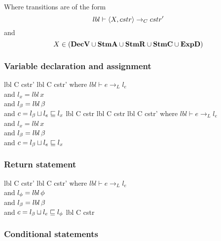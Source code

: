 \noindent Where transitions are of the form
  \[ lbl \vdash \langle X, cstr \rangle \rightarrow_{C} cstr' \]
  and
  \[ X \in (\mathbf{DecV} \cup \mathbf{StmA} \cup \mathbf{StmR} \cup \mathbf{StmC} \cup \mathbf{ExpD}) \]

\subsubsection{Variable declaration and assignment}

\begin{trules}
        {lbl \vdash {} {C} {cstr'} }
        {lbl \vdash {} {C} {cstr'} }
        {where $lbl \vdash e \rightarrow_L l_e$\\
          and $l_x = lbl \, x$\\
          and $l_\beta = lbl \, \beta$\\
          and $c = l_\beta \sqcup l_e \sqsubseteq l_x$}
        {lbl \vdash {} {C} {cstr}}
        {}
        {}
        {lbl \vdash {} {C} {cstr}}
        {lbl \vdash {} {C} {cstr'}}
        {where $lbl \vdash e \rightarrow_L l_e$\\
          and $l_x = lbl \, x$\\
          and $l_\beta = lbl \, \beta$\\
          and $c = l_\beta \sqcup l_e \sqsubseteq l_x$}
\end{trules}

\subsubsection{Return statement}

\begin{trules}
        {lbl \vdash {} {C} {cstr'} }
        {lbl \vdash {} {C} {cstr'} }
        {where $lbl \vdash e \rightarrow_L l_e$\\
          and $l_\phi = lbl \, \phi$\\
          and $l_\beta = lbl \, \beta$\\
          and $c = l_\beta \sqcup l_e \sqsubseteq l_\phi$}
        {lbl \vdash {} {C} {cstr} }
        {}
        {}
        {}
\end{trules}

\subsubsection{Conditional statements}

